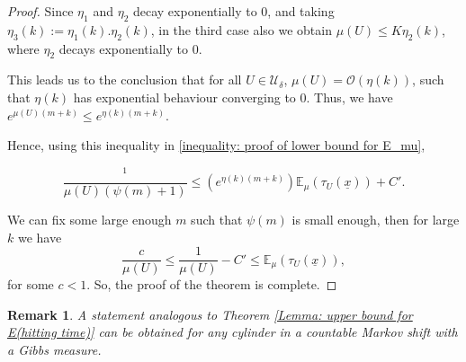 \documentclass[11pt, reqno]{amsart}
\theoremstyle{plain}%
\newtheorem{remark}[theorem]{Remark}
\theoremstyle{definition}
\theoremstyle{definition}
\def\U{\ensuremath{\mathcal U}}
\def\E{\mathbb E}
\def\st{such that }
\def\ulx{\underline{x}}
\numberwithin{equation}{section}
\begin{document}
\begin{proof}
Since $\eta_1$ and $\eta_2$ decay exponentially to 0, and taking $\eta_3(k):=\eta_1(k).\eta_2(k)$, in the third case also we obtain $\mu(U)\le K\eta_2(k)$, where $\eta_2$ decays exponentially to 0.

 
This leads us to the conclusion that for all $U\in \U_\delta$, $\mu(U)=\mathcal{O}\left(\eta(k)\right)$, \st $\eta(k)$ has exponential behaviour converging to 0. Thus, we have $e^{\mu(U)(m+k)}\le e^{\eta(k)(m+k)}$.
  
Hence, using this inequality in \eqref{inequality: proof of lower bound for E_mu},

$$\frac{^{1}}{\mu(U)\left( \psi(m)+1\right)}\le \left(e^{\eta(k)(m+k)}\right)\E_\mu(\tau_U(\ulx))+C'.$$

 
We can fix some large enough $m$ such that $\psi(m)$ is small enough, then for large $k$ we have
$$\frac{c}{\mu(U)}\le\frac{1}{\mu(U)}-C'\le \E_\mu(\tau_U(\ulx)),$$ for some $c<1$. So, the proof of the theorem is complete.
\end{proof}

\begin{remark}
    A statement analogous to Theorem \ref{Lemma: upper bound for E(hitting time)} can be obtained for any cylinder in a countable Markov shift with a Gibbs measure.
\end{remark}
\end{document}
